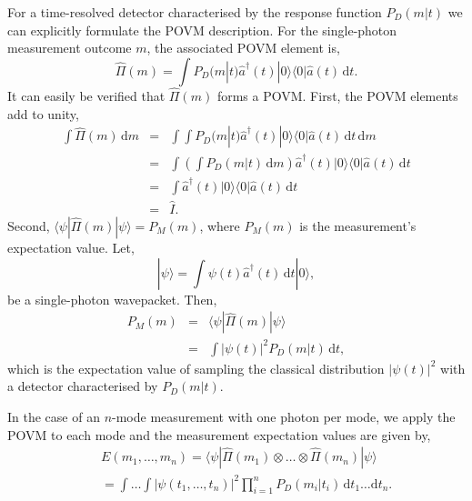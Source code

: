 \documentclass[aps,pra,twocolumn,amsmath,amssymb,color,superscriptaddress]{revtex4}
\newcommand{\bra}[1]{\langle#1|}
\newcommand{\ket}[1]{|#1\rangle}
\begin{document}
For a time-resolved detector characterised by the response function $P_D(m|t)$ we can explicitly formulate the POVM \cite{bib:NielsenChuang00} description. For the single-photon measurement outcome $m$, the associated POVM element is,
\begin{equation}
\hat\Pi(m) = \int P_D(m|t) \hat{a}^\dag(t) \ket{0}\bra{0} \hat{a}(t) \, \mathrm{d}t.
\end{equation}
It can easily be verified that $\hat\Pi(m)$ forms a POVM. First, the POVM elements add to unity,
\begin{eqnarray}
\int \hat\Pi(m) \, \mathrm{d}m &=& \int\!\!\int P_D(m|t) \hat{a}^\dag(t) \ket{0}\bra{0} \hat{a}(t) \, \mathrm{d}t\, \mathrm{d}m \nonumber\\
&=& \int \left(\int P_D(m|t) \,\mathrm{d}m\right) \hat{a}^\dag(t) \ket{0}\bra{0} \hat{a}(t)\, \mathrm{d}t \nonumber \\
&=& \int \hat{a}^\dag(t) \ket{0}\bra{0} \hat{a}(t)\, \mathrm{d}t \nonumber \\
&=& \hat{I}.
\end{eqnarray}
Second, $\bra{\psi}\hat\Pi(m)\ket{\psi}=P_M(m)$, where $P_M(m)$ is the measurement's expectation value. Let,
\begin{equation}
\ket\psi = \int \psi(t) \hat{a}^\dag(t)\,\mathrm{d}t \ket{0},
\end{equation}
be a single-photon wavepacket. Then,
\begin{eqnarray} \label{eq:PM_single_photon}
P_M(m) &=& \bra{\psi}\hat\Pi(m)\ket{\psi} \nonumber \\
&=& \int |\psi(t)|^2 P_D(m|t)\,\mathrm{d}t,
\end{eqnarray}
which is the expectation value of sampling the classical distribution $|\psi(t)|^2$ with a detector characterised by $P_D(m|t)$.

In the case of an $n$-mode measurement with one photon per mode, we apply the POVM to each mode and the measurement expectation values are given by,
\begin{eqnarray}
&&E(m_1,\dots,m_n) = \bra{\psi} \hat\Pi(m_1) \otimes \dots \otimes \hat\Pi(m_n) \ket{\psi} \nonumber \\
&&= \int \!\! \dots \!\! \int |\psi(t_1,\dots,t_n)|^2 \prod_{i=1}^n P_D(m_i|t_i)\,\mathrm{d}t_1\dots\mathrm{d}t_n. \nonumber\\
\end{eqnarray}
\end{document}
